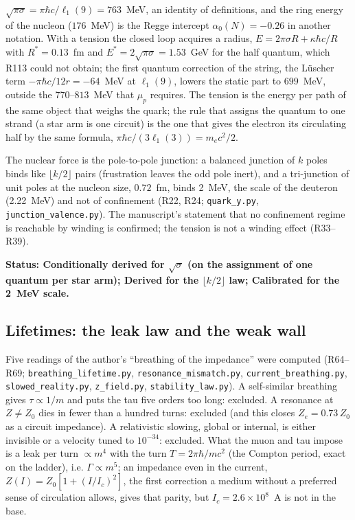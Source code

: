 \documentclass[11pt,a4paper]{article}
\theoremstyle{plain}
\theoremstyle{remark}
\newcommand{\lone}{\ensuremath{\ell_1}}
\newcommand{\status}[1]{\medskip\noindent\textbf{Status: #1.}\ }
\begin{document}
$\sqrt{\pi\sigma} = \pi\hbar c/\lone(9) = 763$~MeV, an identity of definitions, and the ring energy of the nucleon
($176$~MeV) is the Regge intercept $\alpha_0(N) = -0.26$ in another notation. With a tension the closed loop
acquires a radius, $E = 2\pi\sigma R + \kappa\hbar c/R$ with $R^* = 0.13$~fm and $E^* = 2\sqrt{\pi\sigma} = 1.53$~GeV
for the half quantum, which R113 could not obtain; the first quantum correction of the string, the L\"uscher
term $-\pi\hbar c/12r = -64$~MeV at $\lone(9)$, lowers the static part to $699$~MeV, outside the $770$--$813$~MeV
that $\mu_p$ requires. The
tension is the energy per path of the same object that weighs the
quark; the rule that assigns the quantum to one strand (a star arm is one circuit) is the one that
gives the electron its circulating half by the same formula, $\pi\hbar c/(3\lone(3)) = m_e c^2/2$.

The nuclear force is the pole-to-pole junction: a balanced junction of $k$ poles binds like
$\lfloor k/2\rfloor$ pairs (frustration leaves the odd pole inert), and a tri-junction of unit
poles at the nucleon size, $0.72$~fm, binds 2~MeV, the scale of the deuteron (2.22~MeV) and not of
confinement (R22, R24; \texttt{quark\_y.py}, \texttt{junction\_valence.py}). The manuscript's
statement that no confinement regime is reachable by winding is confirmed; the tension is not a
winding effect (R33--R39).

\status{Conditionally derived for $\sqrt\sigma$ (on the assignment of one quantum per star arm);
Derived for the $\lfloor k/2\rfloor$ law; Calibrated for the 2~MeV scale}

\subsection{Lifetimes: the leak law and the weak wall}\label{sec:lifetime}

Five readings of the author's ``breathing of the impedance'' were computed (R64--R69;
\texttt{breathing\_lifetime.py}, \texttt{resonance\_mismatch.py}, \texttt{current\_breathing.py},
\texttt{slowed\_reality.py}, \texttt{z\_field.py}, \texttt{stability\_law.py}). A self-similar
breathing gives $\tau \propto 1/m$ and puts the tau five orders too long: excluded. A resonance at
$Z \ne Z_0$ dies in fewer than a hundred turns: excluded (and this closes $Z_e = 0.73\,Z_0$ as a
circuit impedance). A relativistic slowing, global or internal, is either invisible or a velocity
tuned to $10^{-34}$: excluded. What the muon and tau impose is a leak per turn $\propto m^4$ with
the turn $T = 2\pi\hbar/mc^2$ (the Compton period, exact on the ladder), i.e. $\Gamma \propto m^5$;
an impedance even in the current, $Z(I) = Z_0[1 + (I/I_c)^2]$, the first correction a medium
without a preferred sense of circulation allows, gives that parity, but $I_c = 2.6\times10^8$~A is
not in the base.
\end{document}
